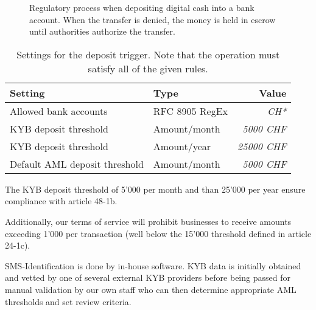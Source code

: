 \begin{figure}[h!]
\begin{center}
  \end{center}
  \caption{Regulatory process when depositing digital cash into a bank
    account.  When the transfer is denied, the money is held in escrow
    until authorities authorize the transfer.}
\end{figure}


\begin{table}[h!]
  \caption{Settings for the deposit trigger. Note that the operation
  must satisfy all of the given rules.}
  \begin{tabular}{l|l|r}
    {\bf Setting}                 & {\bf Type}         & {\bf Value}     \\ \hline \hline
    Allowed bank accounts         & RFC 8905 RegEx     & {\em CH*}       \\ \hline
    KYB deposit threshold         & Amount/month       & {\em  5000 CHF} \\
    KYB deposit threshold         & Amount/year        & {\em 25000 CHF} \\
    Default AML deposit threshold & Amount/month       & {\em  5000 CHF} \\
  \end{tabular}
\end{table}

The KYB deposit threshold of 5'000 \CURRENCY{} per month and than 25'000
\CURRENCY{} per year ensure compliance with article 48-1b.

Additionally, our terms of service will prohibit businesses to receive
amounts exceeding 1'000 \CURRENCY{} per transaction (well below the
15'000 \CURRENCY{} threshold defined in article 24-1c).

SMS-Identification is done by in-house software. KYB data is initially
obtained and vetted by one of several external KYB providers before
being passed for manual validation by our own staff who can then
determine appropriate AML thresholds and set review criteria.
